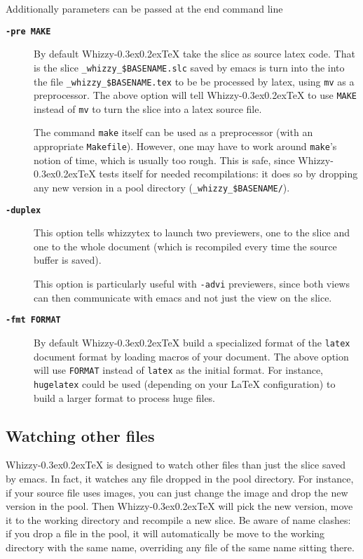 \documentclass{article}
\makeatletter
\let \lst \verb
\def \whizzy {{Whizzy\kern -0.3ex\raise 0.2ex\hbox{\let \@\relax\TeX}}}
\makeatother
\begin{document}
Additionally parameters can be passed at the end command line

\begin{description}
\item[{\bf {\tt -pre MAKE}}]\indent
\label {make}

By default {\whizzy} take the slice as source latex code. 
That is the slice 
\lst"_whizzy_$BASENAME.slc" saved by emacs is turn into the 
into the file \lst"_whizzy_$BASENAME.tex" to be be processed by latex,
using \lst"mv" as a preprocessor.  The above option will tell {\whizzy} to
use \lst"MAKE" instead of \lst"mv" to turn the slice into a latex source
file.

The command \lst"make" itself can be used as a preprocessor (with an
appropriate \lst"Makefile").  However, one may have to work around
\lst"make"'s notion of time, which is usually too rough. 
This is safe, since
{\whizzy} tests itself for needed recompilations: it does so by dropping any
new version in a pool directory (\lst"_whizzy_$BASENAME/"). %

\item[{\bf {\tt -duplex}}]\indent
\label {dupplex}

This option tells whizzytex to launch two previewers, one to the slice and
one to the whole document (which is recompiled every time the source buffer
is saved).

This option is particularly useful with \lst"-advi" previewers, since both
views can then communicate with emacs and not just the view on the slice.

\item[{\bf {\tt -fmt FORMAT}}]\indent

By default {\whizzy} build a specialized format of the \lst"latex" document
format by loading macros of your document.  The above option will use
\lst"FORMAT" instead of \lst"latex" as the initial format. For instance,
\lst"hugelatex" could be used (depending on your {\LaTeX} configuration) to
build a larger format to process huge files.

\end{description}



\subsection {Watching other files}

{\whizzy} is designed to watch other files than just the slice saved by
emacs. In fact, it watches any file dropped in the pool directory. 
For instance, 
if your source file uses images, you can just change the image and
drop the new version in the pool. Then {\whizzy} will pick the new version,
move it to the working directory and recompile a new slice. Be aware of name
clashes: if you drop a file in the pool, it will automatically be move to
the working directory with the same name, overriding any file of the same
name sitting there. 
\end{document}
